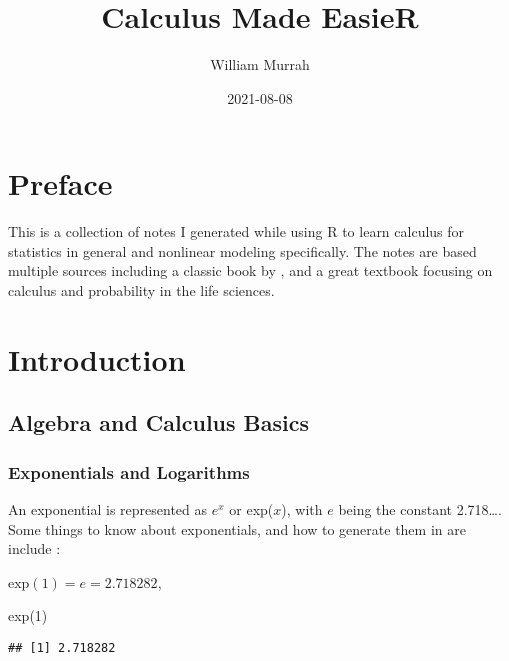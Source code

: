 \documentclass[
]{book}
\title{Calculus Made EasieR}
\author{William Murrah}
\date{2021-08-08}
\newenvironment{Shaded}{\begin{snugshade}}{\end{snugshade}}
\newcommand{\DecValTok}[1]{\textcolor[rgb]{0.00,0.00,0.81}{#1}}
\newcommand{\FunctionTok}[1]{\textcolor[rgb]{0.00,0.00,0.00}{#1}}
\newcommand{\NormalTok}[1]{#1}
\begin{document}
\maketitle

{
\setcounter{tocdepth}{1}
\tableofcontents
}
\hypertarget{preface}{%
\chapter*{Preface}\label{preface}}

This is a collection of notes I generated while using R to learn calculus for statistics in general and nonlinear modeling specifically.
The notes are based multiple sources including a classic book by \citet{thompson1998calculus}, and a great textbook focusing on calculus and probability in the life sciences\citep{adler2012modeling}.

\hypertarget{intro}{%
\chapter{Introduction}\label{intro}}

\hypertarget{algebra-and-calculus-basics}{%
\section{Algebra and Calculus Basics}\label{algebra-and-calculus-basics}}

\hypertarget{exponentials-and-logarithms}{%
\subsection{Exponentials and Logarithms}\label{exponentials-and-logarithms}}

An exponential is represented as \(e^x\) or exp(\(x\)), with \(e\) being the constant 2.718\ldots.
Some things to know about exponentials, and how to generate them in are include \citep{bolker2008ecological}:

\(\text{exp}(1) = e = 2.718282\),

\begin{Shaded}
\begin{Highlighting}[]
\FunctionTok{exp}\NormalTok{(}\DecValTok{1}\NormalTok{)}
\end{Highlighting}
\end{Shaded}

\begin{verbatim}
## [1] 2.718282
\end{verbatim}
\end{document}
